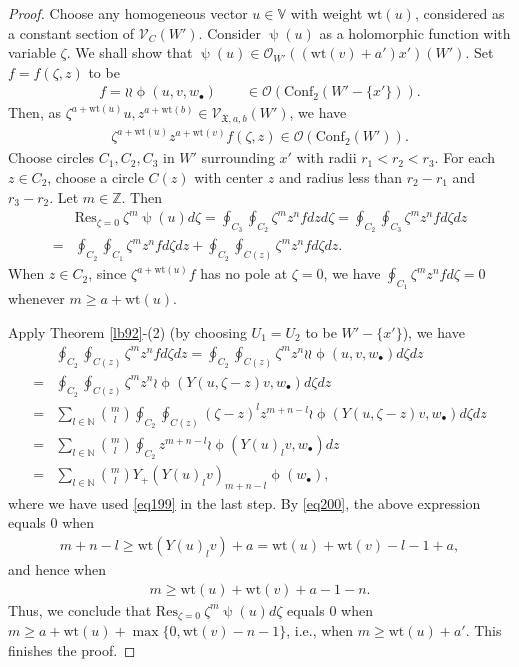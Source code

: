 \documentclass[12pt,a4paper,notitlepage]{report}
\theoremstyle{definition}
\theoremstyle{plain}
\newcommand{\fk}{\mathfrak}
\newcommand{\Conf}{\mathrm{Conf}}
\newcommand{\Res}{\mathrm{Res}}
\newcommand{\scr}{\mathscr}
\newcommand{\blt}{\bullet}
\newcommand{\Vbb}{\mathbb V}
\newcommand{\Nbb}{\mathbb N}
\newcommand{\Zbb}{\mathbb Z}
\newcommand{\wt}{\mathrm{wt}}
\numberwithin{equation}{section}
\begin{document}
\begin{proof}
Choose any homogeneous vector $u\in\Vbb$ with weight $\wt(u)$, considered as a constant section of $\scr V_C(W')$.  Consider $\uppsi(u)$ as a holomorphic function with variable $\zeta$. We shall show that $\uppsi(u)\in\scr O_{W'}((\wt(v)+a')x')(W')$. Set $f=f(\zeta,z)$ to be
\begin{align*}
f=\wr\wr\upphi(u,v,w_\blt)\qquad\in\scr O(\Conf_2(W'-\{x'\})).
\end{align*}
Then, as $\zeta^{a+\wt(u)}u,z^{a+\wt(b)}\in\scr V_{\fk X,a,b}(W')$, we have
\begin{align*}
\zeta^{a+\wt(u)}z^{a+\wt(v)}f(\zeta,z)\in\scr O(\Conf_2(W')).
\end{align*}
Choose circles $C_1,C_2,C_3$ in $W'$ surrounding $x'$ with radii $r_1<r_2<r_3$. For each $z\in C_2$, choose a circle $C(z)$ with center $z$ and radius less than $r_2-r_1$ and $r_3-r_2$. Let $m\in\Zbb$.  Then
\begin{align*}
&\Res_{\zeta=0}~\zeta^m\uppsi(u)d\zeta=\oint_{C_3}\oint_{C_2}\zeta^mz^nfdzd\zeta=\oint_{C_2}\oint_{C_3}\zeta^mz^nfd\zeta dz\\
=&\oint_{C_2}\oint_{C_1}\zeta^mz^nfd\zeta dz+\oint_{C_2}\oint_{C(z)}\zeta^mz^nfd\zeta dz.
\end{align*}
When $z\in C_2$, since $\zeta^{a+\wt(u)}f$ has no pole at $\zeta=0$, we have $\oint_{C_1}\zeta^mz^nfd\zeta=0$ whenever $m\geq a+\wt(u)$. 

Apply Theorem \ref{lb92}-(2) (by choosing $U_1=U_2$ to be $W'-\{x'\}$), we have
\begin{align*}
&\oint_{C_2}\oint_{C(z)}\zeta^mz^nfd\zeta dz=\oint_{C_2}\oint_{C(z)}\zeta^mz^n\wr\wr\upphi(u,v,w_\blt)d\zeta dz\\
=&\oint_{C_2}\oint_{C(z)}\zeta^mz^n\wr\upphi(Y(u,\zeta-z)v,w_\blt)d\zeta dz\\
=&\sum_{l\in\Nbb}{m\choose  l}\oint_{C_2}\oint_{C(z)}(\zeta-z)^lz^{m+n-l}\wr\upphi(Y(u,\zeta-z)v,w_\blt)d\zeta dz\\
=&\sum_{l\in\Nbb}{m\choose  l}\oint_{C_2}z^{m+n-l}\wr\upphi(Y(u)_lv,w_\blt)dz\\
=&\sum_{l\in\Nbb}{m\choose  l}Y_+(Y(u)_lv)_{m+n-l}\upphi(w_\blt),
\end{align*}
where we have used \eqref{eq199} in the last step. By \eqref{eq200}, the above expression equals $0$ when
\begin{align*}
m+n-l\geq\wt(Y(u)_lv)+a=\wt(u)+\wt(v)-l-1+a,
\end{align*}
and hence when
\begin{align*}
m\geq \wt(u)+\wt(v)+a-1-n.
\end{align*}
Thus, we conclude that $\Res_{\zeta=0}~\zeta^m\uppsi(u)d\zeta$ equals $0$ when $m\geq a+\wt(u)+\max\{0,\wt(v)-n-1\}$, i.e., when $m\geq \wt(u)+a'$. This finishes the proof.
\end{proof}
\end{document}
